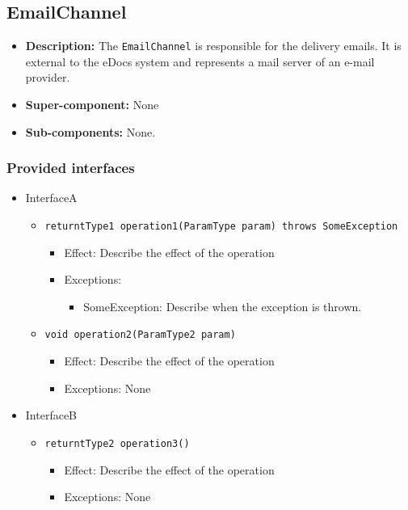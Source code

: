 \documentclass[a4paper,10pt]{article}
\begin{document}
\subsection{EmailChannel}
\begin{itemize}
    \item \textbf{Description:} The \texttt{EmailChannel} is responsible for the delivery emails.
It is external to the eDocs system and represents a mail server of an e-mail provider.
    \item \textbf{Super-component:} None
    \item \textbf{Sub-components:} None.
\end{itemize}

\subsubsection*{Provided interfaces}
\begin{itemize}
    \item InterfaceA
    \begin{itemize}
        \item \texttt{returntType1 operation1(ParamType param) throws SomeException}
        \begin{itemize}
            \item Effect: Describe the effect of the operation
            \item Exceptions:
            \begin{itemize}
                \item SomeException: Describe when the exception is thrown.
            \end{itemize}
		\end{itemize}
        \item \texttt{void operation2(ParamType2 param)}
        \begin{itemize}
            \item Effect: Describe the effect of the operation
            \item Exceptions: None
        \end{itemize}
    \end{itemize}

    \item InterfaceB
    \begin{itemize}
        \item \texttt{returntType2 operation3()}
        \begin{itemize}
            \item Effect: Describe the effect of the operation
            \item Exceptions: None
        \end{itemize}
    \end{itemize}
\end{itemize}
\end{document}
